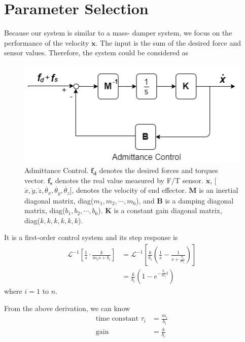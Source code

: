 \section{Parameter Selection}
\label{sec:affection}
\hspace*{6mm}Because our system is similar to a mass- damper system, we focus on the performance of the velocity $\boldsymbol{\dot{x}}$. The input is the sum of the desired force and sensor values. Therefore, the system could be considered as
\begin{figure}[htbp]
\begin{center}
\includegraphics[width=0.55\linewidth]{Images/mass spring.png}
\hspace*{6mm}\end{center}
\caption{
Admittance Control. $\boldsymbol{f_d}$ denotes the desired forces and torques vector. $\boldsymbol{f_s}$ denotes the real value measured by F/T sensor. $\boldsymbol{\dot{x}}$, [$\dot{x}, \dot{y}, \dot{z}, \dot{\theta _x}, \dot{\theta _y}, \dot{\theta _z}$],  denotes the velocity of end effector. $\mathbf{M}$ is an inertial diagonal matrix, diag($m_1,m_2,\cdots ,m_6$), and $\mathbf{B}$ is a damping diagonal matrix, diag($b_1,b_2,\cdots ,b_6$). $\mathbf{K}$ is a constant gain diagonal matrix, diag($k,k,k,k,k,k$). 
}\label{fig:mass spring}
\end{figure}
\par\noindent
It is a first-order control system and its step response is 
\begin{equation}
\begin{split}
\mathcal{L}^{-1} \left[ \frac{1}{s} \cdot \frac{k}{m_is+b_i} \right] 
&= \mathcal{L}^{-1} \left[ \frac{k}{b_i} \left( \frac{1}{s} - \frac{1}{s+\frac{b_i}{m_i}} \right) \right] \\
&= \frac{k}{b_i} \left(1 - e^{- \frac{b_i}{m_i} t}  \right)
\end{split}
\end{equation}
where $i = 1$ to $n$.
\par\noindent
From the above derivation, we can know 
\begin{equation}
\begin{split}
\text{time constant } \tau_i &= \frac{m_i}{b_i}\\
\text{gain} &= \frac{k}{b_i}
\end{split}
\end{equation}
